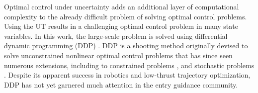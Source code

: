 \documentclass[journal ]{new-aiaa}
\begin{document}
Optimal control under uncertainty adds an additional layer of computational complexity to the already difficult problem of solving optimal control problems. Using the UT results in a challenging optimal control problem in many state variables. In this work, the large-scale problem is solved using differential dynamic programming (DDP) \cite{DDP}. DDP is a shooting method originally devised to solve unconstrained nonlinear optimal control problems that has since seen numerous extensions, including to constrained problems \cite{DDP_ControlLimited,HDDP1,HDDP2,DDP_NonlinearConstraints,DDP_InteriorPoint}, and stochastic problems \cite{iLQG, DDP_Stochastic, ozaki_UT,ozaki2020tube}. 
Despite its apparent success in robotics and low-thrust trajectory optimization, DDP has not yet garnered much attention in the entry guidance community. 




\end{document}
